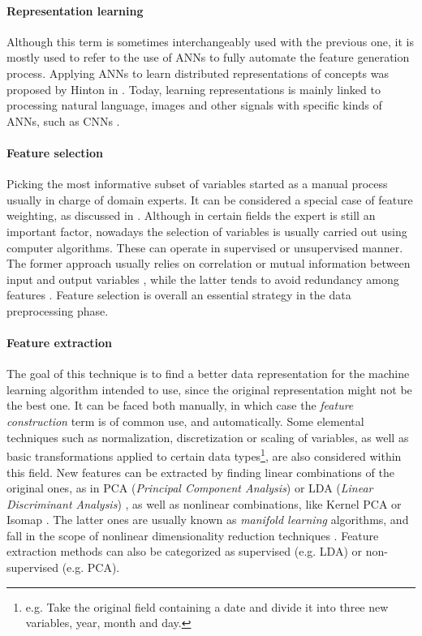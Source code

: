     \paragraph{Representation learning }
    Although this term is sometimes interchangeably used with the previous one, it is mostly used to refer to the use of ANNs to fully automate the feature generation process. Applying ANNs to learn distributed representations of concepts was proposed by Hinton in . Today, learning representations is mainly linked to processing natural language, images and other signals with specific kinds of ANNs, such as CNNs .
  
    \paragraph{Feature selection } 
    Picking the most informative subset of variables started as a manual process usually in charge of domain experts. It can be considered a special case of feature weighting, as discussed in . Although in certain fields the expert is still an important factor, nowadays the selection of variables is usually carried out using computer algorithms. These can operate in supervised or unsupervised manner. The former approach usually relies on correlation or mutual information between input and output variables , while the latter tends to avoid redundancy among features . Feature selection is overall an essential strategy in the data preprocessing  phase.
    
    \paragraph{Feature extraction } 
    The goal of this technique is to find a better data representation for the machine learning algorithm intended to use, since the original representation might not be the best one. It can be faced both manually, in which case the \textit{feature construction} term is of common use, and automatically. Some elemental techniques such as normalization, discretization or scaling of variables, as well as basic transformations applied to certain data types\footnote{e.g. Take the original field containing a date and divide it into three new variables, year, month and day.}, are also considered within this field. New features can be extracted by finding linear combinations of the original ones, as in PCA (\textit{Principal Component Analysis})  or LDA (\textit{Linear Discriminant Analysis}) , as well as nonlinear combinations, like Kernel PCA   or Isomap . The latter ones are usually known as \textit{manifold learning}  algorithms, and fall in the scope of nonlinear dimensionality reduction techniques . Feature extraction methods can also be categorized as supervised (e.g. LDA) or non-supervised (e.g. PCA).
    
